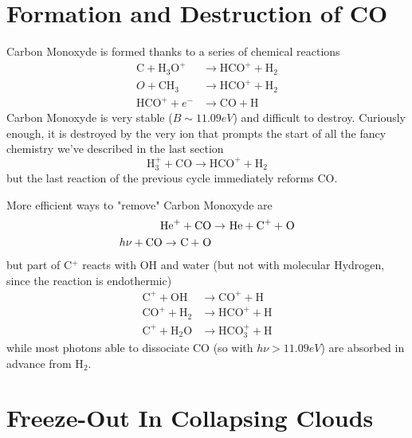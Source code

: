 \section{Formation and Destruction of CO}

Carbon Monoxyde is formed thanks to a series of chemical reactions
\begin{align*}
    \text{C} + \text{H}_{3}\text{O}^{+} &\to \text{HCO}^{+} + \text{H}_{2}\\
    O + \text{CH}_{3} &\to \text{HCO}^{+} + \text{H}_{2}\\
    \text{HCO}^{+} + e^{-} &\to \text{CO} + \text{H}
\end{align*}
Carbon Monoxyde is very stable ($B \sim 11.09\unit{eV}$) and difficult to destroy. Curiously enough, it is destroyed by the very ion that prompts the start of all the fancy chemistry we've described in the last section
\begin{equation*}
    \text{H}_{3}^{+} + \text{CO} \to \text{HCO}^{+} + \text{H}_{2}
\end{equation*}
but the last reaction of the previous cycle immediately reforms CO. 
\par More efficient ways to "remove" Carbon Monoxyde are 
\begin{align*}
    \text{He}^{+} + \text{CO} &\to ^{}_{}\text{He} + \text{C}^{+} + ^{}_{}\text{O}\\
    h\nu + \text{CO} \to ^{}_{}\text{C} + ^{}_{}\text{O}
\end{align*}
but part of C$^{+}$ reacts with OH and water (but not with molecular Hydrogen, since the reaction is endothermic)
\begin{align*}
    \text{C}^{+} + \text{OH} &\to \text{CO}^{+} + \text{H}\\
    \text{CO}^{+} + \text{H}_{2} &\to \text{HCO}^{+} + \text{H}\\
    \text{C}^{+} + \text{H}_{2}\text{O} &\to \text{HCO}_{3}^{+} + \text{H}
\end{align*}
while most photons able to dissociate CO (so with $h\nu > 11.09\unit{eV}$) are absorbed in advance from H$_{2}$.

\section{Freeze-Out In Collapsing Clouds}

